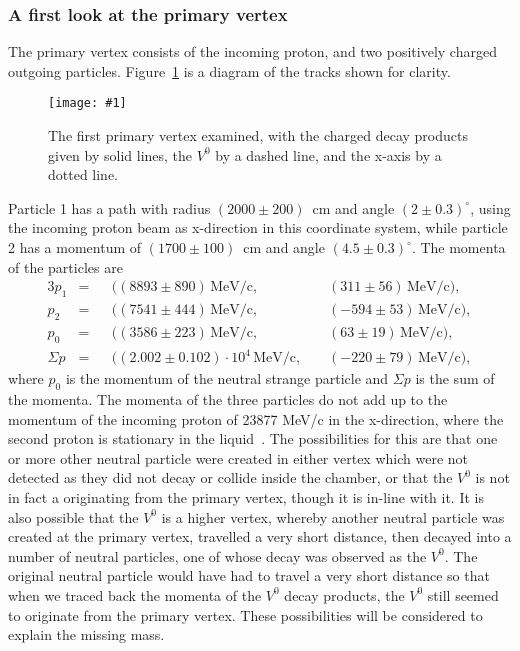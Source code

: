 \documentclass[twocolumn]{article}
\newcommand{\insertFigure}[1]{%
   \texttt{[image: \#1]}%
}
\begin{document}
\subsubsection{A first look at the primary vertex} \label{sec:part}
The primary vertex consists of the incoming proton, and two positively charged outgoing particles. Figure~\ref{fig:primary1} is a diagram of the tracks shown for clarity.
\begin{figure} [!h]
	\centering
	\insertFigure{Images/primary_1.png}
	\caption{The first primary vertex examined, with the charged decay products given by solid lines, the $V^0$ by a dashed line, and the x-axis by a dotted line.}
	\label{fig:primary1}
\end{figure}
Particle 1 has a path with radius $(2000 \pm 200)$~cm and angle $(2 \pm 0.3)^{\circ}$, using the incoming proton beam as x-direction in this coordinate system, while particle 2 has a momentum of $(1700 \pm 100)$~cm and angle $(4.5 \pm 0.3)^{\circ}$. The momenta of the particles are
\begin{alignat*}{3}
p_1 &= &&((8893 \pm 890)\, \text{MeV/c},\hspace{3pt} && (311 \pm 56)\, \text{MeV/c}),\\
p_2 &= &&((7541 \pm 444)\, \text{MeV/c},\hspace{3pt} && (-594 \pm 53)\, \text{MeV/c}),\\
p_0 &= &&((3586 \pm 223)\, \text{MeV/c},\hspace{3pt} && (63 \pm 19)\, \text{MeV/c}),\\[6pt]
\Sigma p &= &&((2.002 \pm 0.102) \cdot 10^4\, \text{MeV/c},\hspace{3pt} && (-220 \pm 79)\, \text{MeV/c}),
\end{alignat*}
where $p_0$ is the momentum of the neutral strange particle and $\Sigma p$ is the sum of the momenta. The momenta of the three particles do not add up to the momentum of the incoming proton of 23877 MeV/c in the x-direction, where the second proton is stationary in the liquid~\cite{seul}. The possibilities for this are that one or more other neutral particle were created in either vertex which were not detected as they did not decay or collide inside the chamber, or that the $V^0$ is not in fact a originating from the primary vertex, though it is in-line with it. It is also possible that  the $V^0$ is a higher vertex, whereby another neutral particle was created at the primary vertex, travelled a very short distance, then decayed into a number of neutral particles, one of whose decay was observed as the $V^0$. The original neutral particle would have had to travel a very short distance so that when we traced back the momenta of the $V^0$ decay products, the $V^0$ still seemed to originate from the primary vertex. These possibilities will be considered to explain the missing mass.
\end{document}
